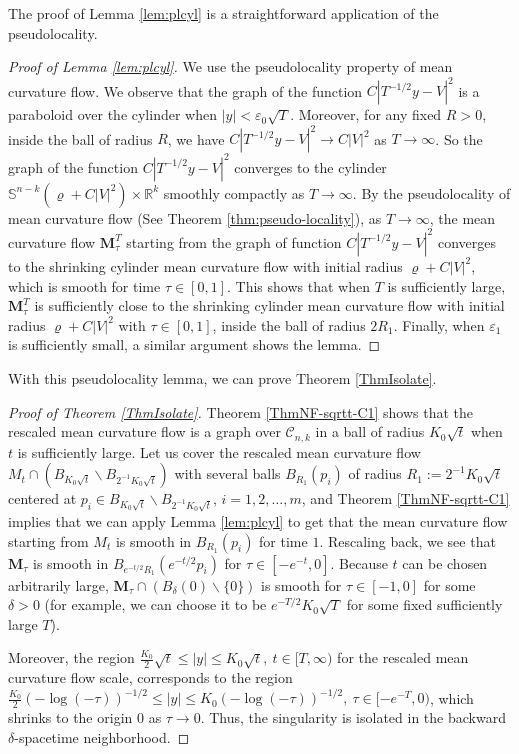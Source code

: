 \documentclass[11pt]{amsart}
\numberwithin{equation}{section}
\numberwithin{equation}{section}
\newcommand{\eps}{\varepsilon}
\newcommand{\bM}{\mathbf{M}}
\newcommand{\cC}{\mathcal{C}}
\newcommand{\R}{\mathbb{R}}
\begin{document}
	The proof of Lemma \ref{lem:plcyl} is a straightforward application of the pseudolocality. 
	\begin{proof}[Proof of Lemma \ref{lem:plcyl}]
		We use the pseudolocality property of mean curvature flow. We observe that the graph of the function $C|T^{-1/2}y-V|^2$ is a paraboloid over the cylinder when $|y|<\eps_0\sqrt{T}$. Moreover, for any fixed $R>0$, inside the ball of radius $R$, we have $C|T^{-1/2}y-V|^2\to C|V|^2$ as $T\to\infty$. So the graph of the function $C|T^{-1/2}y-V|^2$ converges to the cylinder $\mathbb S^{n-k}(\varrho+C|V|^2)\times\R^k$ smoothly compactly as $T\to\infty$. By the pseudolocality of mean curvature flow (See Theorem \ref{thm:pseudo-locality}), as $T\to\infty$, the mean curvature flow $\bM_\tau^T$ starting from the graph of function $C|T^{-1/2}y-V|^2$ converges to the shrinking cylinder mean curvature flow with initial radius $\varrho+C|V|^2$, which is smooth for time $\tau\in[0,1]$. This shows that when $T$ is sufficiently large, $\bM_\tau^T$ is sufficiently close to the shrinking cylinder mean curvature flow with initial radius $\varrho+C|V|^2$ with $\tau\in[0,1]$, inside the ball of radius $2R_1$. Finally, when $\eps_1$ is sufficiently small, a similar argument shows the lemma.	
	\end{proof}
	
	
	
	With this pseudolocality lemma, we can prove Theorem \ref{ThmIsolate}.
	
	\begin{proof}[Proof of Theorem \ref{ThmIsolate}] 
		Theorem \ref{ThmNF-sqrtt-C1} shows that the rescaled mean curvature flow is a graph over $\cC_{n,k}$ in a ball of radius $K_0\sqrt{t}$ when $t$ is sufficiently large. Let us cover the rescaled mean curvature flow $M_t\cap (B_{K_0\sqrt{t}}\backslash B_{2^{-1}K_0\sqrt{t}})$ with several balls $B_{R_1}(p_i)$ of radius $R_1:=2^{-1}K_0\sqrt{t}$ centered at $p_i\in B_{K_0\sqrt{t}}\backslash B_{2^{-1}K_0\sqrt{t}}$, $i=1,2,\ldots,m$, and Theorem \ref{ThmNF-sqrtt-C1} implies that we can apply Lemma \ref{lem:plcyl} to get that the mean curvature flow starting from $M_t$ is smooth in $B_{R_1}(p_i)$ for time $1$. Rescaling back, we see that $\bM_{\tau}$ is smooth in $B_{e^{-t/2}R_1}(e^{-t/2}p_i)$ for $\tau\in[-e^{-t},0]$. Because $t$ can be chosen arbitrarily large, $\bM_{\tau}\cap (B_{\delta}(0)\backslash\{0\})$ is smooth for $\tau\in[-1,0]$ for some $\delta>0$ (for example, we can choose it to be $e^{-T/2}K_0\sqrt{T}$ for some fixed sufficiently large $T$).
		
		Moreover, the region $\frac{K_0}{2}\sqrt t\leq |y|\leq K_0\sqrt t,\ t\in [T,\infty)$ for the rescaled mean curvature flow scale, corresponds to the region $\frac{K_0}{2} (-\log (-\tau))^{-1/2}\leq |y|\leq K_0 (-\log (-\tau))^{-1/2}, \ \tau \in [-e^{-T}, 0)$, which shrinks to the origin $0$ as $\tau\to 0$. Thus, the singularity is isolated in the backward $\delta$-spacetime neighborhood. 
	\end{proof}
	
\end{document}
